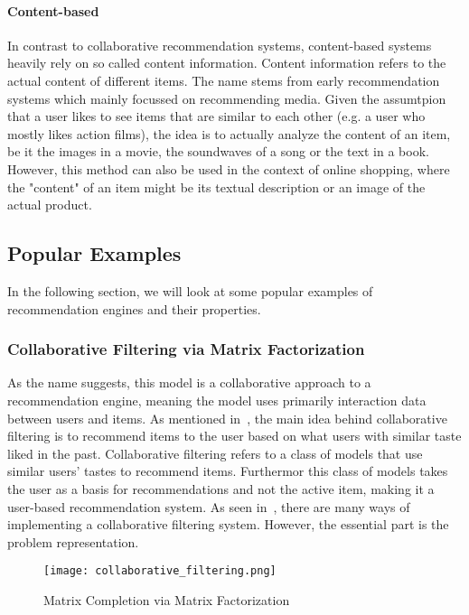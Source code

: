\paragraph{Content-based}
In contrast to collaborative recommendation systems, content-based systems heavily rely on so called content information.
Content information refers to the actual content of different items.
The name stems from early recommendation systems which mainly focussed on recommending media.
Given the assumtpion that a user likes to see items that are similar to each other (e.g. a user who mostly likes action films), the idea is to actually analyze the content of an item, be it the images in a movie, the soundwaves of a song or the text in a book.
However, this method can also be used in the context of online shopping, where the "content" of an item might be its textual description or an image of the actual product.
\subsection{Popular Examples}
In the following section, we will look at some popular examples of recommendation engines and their properties.
\subsubsection{Collaborative Filtering via Matrix Factorization}
As the name suggests, this model is a collaborative approach to a recommendation engine, meaning the model uses primarily interaction data between users and items.
As mentioned in~\cite{intro_recsys}, the main idea behind collaborative filtering is to recommend items to the user based on what users with similar taste liked in the past.
Collaborative filtering refers to a class of models that use similar users' tastes to recommend items.
Furthermor this class of models takes the user as a basis for recommendations and not the active item, making it a user-based recommendation system.
As seen in~\cite{collaborative_filtering}, there are many ways of implementing a collaborative filtering system.
However, the essential part is the problem representation.

\begin{figure}[ht]
	\centering
	\captionsetup{width=0.8\textwidth}
    \texttt{[image: collaborative\_filtering.png]}
    \caption{Matrix Completion via Matrix Factorization}
    \label{fig:collaborative_filtering}
\end{figure}

